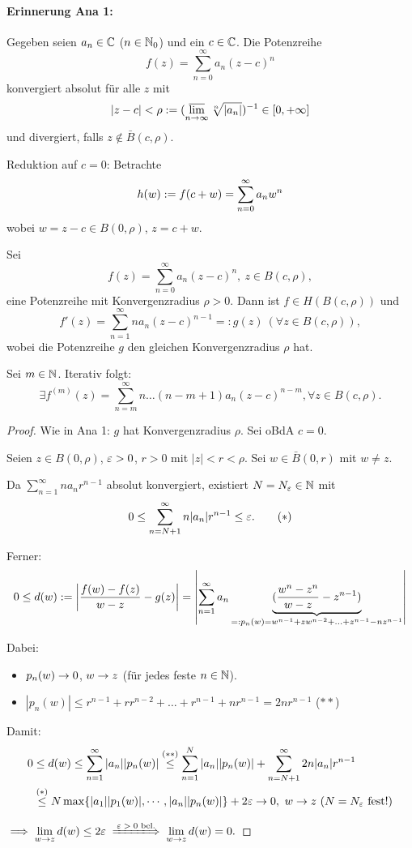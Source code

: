 \documentclass[a4paper,twoside,DIV15,BCOR12mm]{scrbook}
\begin{document}
\paragraph{Erinnerung Ana 1:} Gegeben seien $a_n\in\mathbb{C}$ ($n\in\mathbb{N}_0$) und ein $c\in\mathbb{C}$. Die Potenzreihe
\[f(z) = \sum_{n=0}^\infty a_n(z-c)^n\]
konvergiert absolut für alle $z$ mit
\[|z-c| < \rho := (\varlimsup_{n\rightarrow\infty}\sqrt[n]{|a_n|})^{-1}\in[0,+\infty]\] 
und divergiert, falls $z\notin \bar{B}(c,\rho)$.

Reduktion auf $c=0$: Betrachte
\[h(w) := f(c+w) = \sum_{n=0}^\infty a_n w^n\]
wobei $w=z-c\in B(0,\rho)$, $z=c+w$.

\begin{satz} Sei
\[f(z) = \sum_{n=0}^\infty a_n(z-c)^n,\ z\in B(c,\rho),\]
eine Potenzreihe mit Konvergenzradius $\rho > 0$. Dann ist $f\in H(B(c,\rho))$ und
\[f'(z) = \sum_{n=1}^\infty n a_n(z-c)^{n-1} =: g(z)\ (\forall z\in B(c,\rho)),\]
wobei die Potenzreihe $g$ den gleichen Konvergenzradius $\rho$ hat.

Sei $m\in\mathbb{N}$. Iterativ folgt:
\[\exists f^{(m)}(z) = \sum_{n=m}^\infty n\dotsc (n-m+1) a_n(z-c)^{n-m}, \forall z\in B(c,\rho).\]
\end{satz}
\begin{proof} Wie in Ana 1: $g$ hat Konvergenzradius $\rho$. Sei oBdA $c = 0$.

Seien $z\in B(0,\rho)$, $\varepsilon>0$, $r>0$ mit $|z|<r<\rho$. Sei $w\in \bar{B}(0,r)$ mit $w\neq z$.

Da $\sum_{n=1}^\infty na_nr^{n-1}$ absolut konvergiert, existiert $N = N_\varepsilon\in\mathbb{N}$ mit
\[0 \leq \sum_{n=N+1}^\infty n |a_n| r^{n-1} \leq \varepsilon.\tag{$\ast$}\]

Ferner:
\[0\leq d(w) := \left| \frac{f(w)-f(z)}{w-z} - g(z)\right| = \left| \sum_{n=1}^\infty a_n\underbrace{(\frac{w^n-z^n}{w-z} - z^{n-1})}_{=: p_n(w) = w^{n-1}+zw^{n-2}+\dotsc+z^{n-1}-nz^{n-1}}\right|\]

Dabei: %
\begin{itemize}
\item $p_n(w) \rightarrow 0$, $w\rightarrow z$ (für jedes feste $n\in\mathbb{N}$).
\item $|p_n(w)| \leq r^{n-1} + rr^{n-2} + \dotsc + r^{n-1} + nr^{n-1} = 2nr^{n-1}$ \hfill($\ast\ast$)
\end{itemize}

Damit:
\begin{eqnarray*}
0&\leq d(w) \leq \sum_{n=1}^\infty |a_n||p_n(w)| \stackrel{(\ast\ast)}{\leq} \sum_{n=1}^N |a_n||p_n(w)| + \sum_{n=N+1}^\infty 2n|a_n|r^{n-1}\\
&\stackrel{(\ast)}{\leq} N \max\{|a_1||p_1(w)|,\dotsb,|a_n||p_n(w)|\} + 2\varepsilon \rightarrow 0,\ w\rightarrow z\ (N = N_\varepsilon\ \text{fest!})
\end{eqnarray*}

$\displaystyle\folgt \lim_{w\ra z} d(w) \leq 2\ep \folgtnach{$\ep>0$ bel.} \lim_{w\ra z} d(w) = 0.$
\end{proof}
\end{document}
